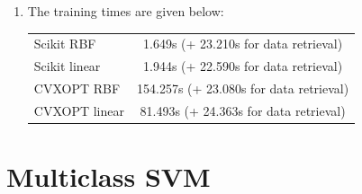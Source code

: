 \documentclass[12pt]{article}
\begin{document}
\begin{enumerate}[label=(\alph*)]
\begin{enumerate}[label=\roman*.]
        \item The training times are given below:
            \begin{center}
                \begin{tabular}{|l|c|}
                    \hline
                    Scikit RBF & 1.649s (+ 23.210s for data retrieval) \\
                    Scikit linear & 1.944s (+ 22.590s for data retrieval)\\
                    CVXOPT RBF & 154.257s (+ 23.080s for data retrieval)\\
                    CVXOPT linear & 81.493s (+ 24.363s for data retrieval)\\
                    \hline
                \end{tabular}
            \end{center}
    \end{enumerate}

\end{enumerate}

\section{Multiclass SVM}
\end{document}
